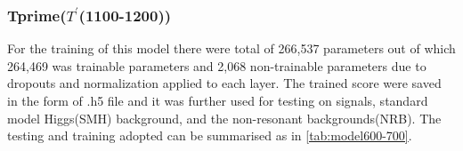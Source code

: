 \subsubsection{Tprime($T^'$(1100-1200))}
For the training of this model there were total of  266,537 parameters out of which 264,469 was trainable parameters and 2,068 non-trainable parameters due to dropouts and normalization applied to each layer. The trained score were saved in the form of .h5 file and it was further used for testing on signals, standard model Higgs(SMH) background, and the non-resonant backgrounds(NRB). The testing and training adopted can be summarised as in \autoref{tab:model600-700}.




                        
